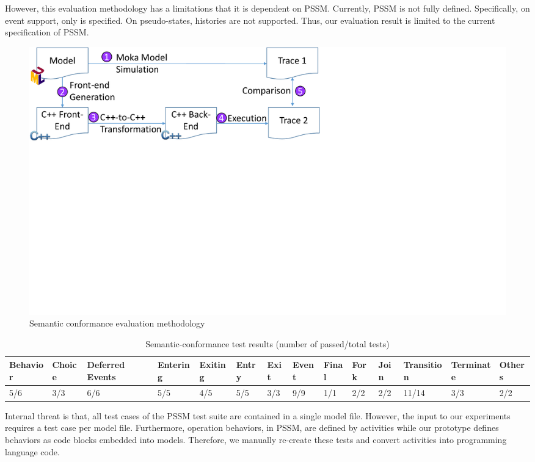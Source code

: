 However, this evaluation methodology has a limitations that it is dependent on PSSM.
Currently, PSSM is not fully defined.
Specifically, on event support, only  is specified.
On pseudo-states, histories are not supported.
Thus, our evaluation result is limited to the current specification of PSSM.

\begin{figure}
	\centering
	\includegraphics[clip, trim=0cm 12.0cm 12.7cm 0cm, width=\columnwidth]{figures/semanticconformance.pdf}
	\caption{Semantic conformance evaluation methodology} 
	\label{fig:semanticconformance}
\end{figure}		


\begin{table}[]
	\centering
	\caption{Semantic-conformance test results (number of passed/total tests)}
	\label{table:semantic-test}
	\begin{tabular}{|l|l|l|l|l|l|l|l|l|l|l|l|l|l|}
		\hline
		Behavior & Choice & Deferred Events & Entering & Exiting & Entry & Exit & Event & Final & Fork & Join & Transition & Terminate & Others \\ \hline
		5/6&        3/3&         6/6        &    5/5      &    4/5     &  5/5     &   3/3   &    9/9    &   1/1    &   2/2   &   2/2   &      11/14      &    3/3       &    2/2    \\ \hline
	\end{tabular}
\end{table}

\noindent
{}
Internal threat is that, all test cases of the PSSM test suite are contained in a single model file.
However, the input to our experiments requires a test case per model file.
Furthermore, operation behaviors, in PSSM, are defined by activities while our prototype defines behaviors as code blocks embedded into models.
Therefore, we manually re-create these tests and convert activities into programming language code.

